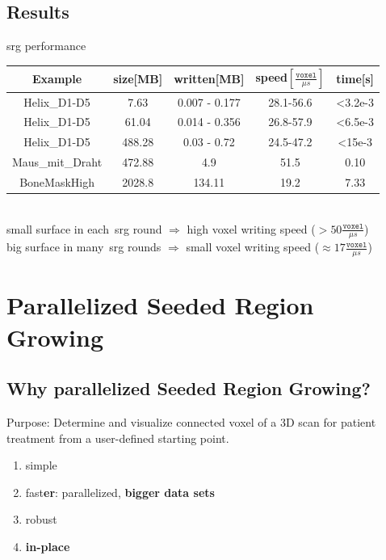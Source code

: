 \documentclass{beamer}
\begin{document}
\subsection{Results}
\begin{frame}{\Ac{srg} performance}
\centering
\small
\begin{tabularx}{\textwidth}{c|c|c|c|c}
\centering
\textbf{Example} & \textbf{size}[MB] & \textbf{written}[MB] & \textbf{speed}$[\frac{\texttt{voxel}}{\mu s}]$ & \textbf{time}[s]\\
\hline
  Helix\_D1-D5 & 7.63       & 0.007 - 0.177 & 28.1-56.6 & <3.2e-3\\
  Helix\_D1-D5 & 61.04      & 0.014 - 0.356 & 26.8-57.9 & <6.5e-3\\
  Helix\_D1-D5 & 488.28     & 0.03 - 0.72   & 24.5-47.2 & <15e-3 \\
  Maus\_mit\_Draht & 472.88 & 4.9           & 51.5      & 0.10 \\
  BoneMaskHigh & 2028.8     & 134.11        & 19.2      & 7.33
\end{tabularx}
\\
  \vspace{1cm}
  small surface in each~\ac{srg} round $\Rightarrow$ high voxel writing speed ($> 50\frac{\texttt{voxel}}{\mu s}$)\\
  big surface in many~\ac{srg} rounds $\Rightarrow$ small voxel writing speed ($\approx 17\frac{\texttt{voxel}}{\mu s}$)

\end{frame}
\section{Parallelized Seeded Region Growing}
\begin{frame}
  \tableofcontents[currentsection]
\end{frame}
\subsection{Why parallelized Seeded Region Growing?}
\begin{frame}{\insertsubsection}
\centering
  Purpose: Determine and visualize connected voxel of a 3D scan for patient treatment from a user-defined starting point.\\
  \vspace{1cm}
  \begin{enumerate}
      \item simple
      \item fast\textbf{er}: parallelized, \textbf{bigger data sets}
      \item robust
      \item \textbf{in-place} %
  \end{enumerate}
\end{frame}
\end{document}
